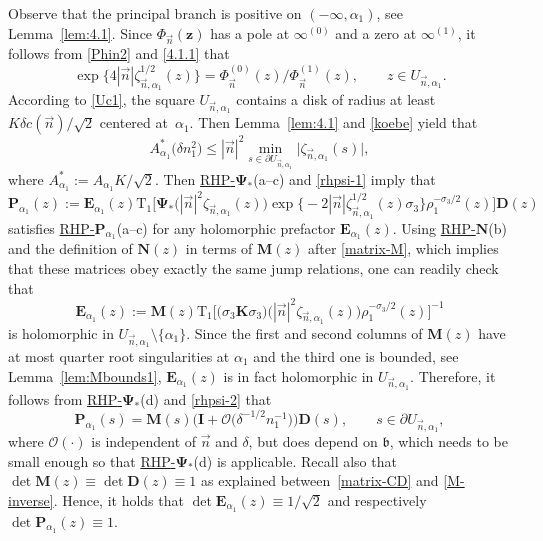 \documentclass[10pt,a4paper]{amsart}
\numberwithin{equation}{section}
\renewcommand{\det}{\operatorname{det}}
\newcommand{\n}{{\vec n}}
\newcommand{\rhn} {\textnormal{RHP}-${\boldsymbol N}$}
\newcommand{\rhp} {\textnormal{RHP}-${\boldsymbol P}$}
\newcommand{\rhwpsi} {\textnormal{RHP}-${\boldsymbol \Psi_*}$}
\newcommand{\z}	{{\boldsymbol z}}
\begin{document}
Observe that the principal branch \smash{$ \zeta_{\n,\alpha_1}^{1/2}(z) $} is positive on $ (-\infty,\alpha_1) $, see Lemma~\ref{lem:4.1}. Since $ \Phi_\n(\z) $ has a pole at $ \infty^{(0)} $ and a zero at $ \infty^{(1)} $, it follows from \eqref{Phin2} and \eqref{4.1.1} that
\begin{equation}
\label{rhpsi-1}
\exp\bigl\{4|\n|\zeta_{\n,\alpha_1}^{1/2}(z) \bigr\} = \Phi_\n^{(0)}(z)/\Phi_\n^{(1)}(z), \qquad z\in U_{\n,\alpha_1}.
\end{equation}
According to \eqref{Uc1}, the square $ U_{\n,\alpha_1} $ contains a disk of radius at least $ K\delta c(\n)/\sqrt 2 $ centered at~$ \alpha_1 $. Then Lemma~\ref{lem:4.1} and \eqref{koebe} yield that
\begin{equation}
\label{rhpsi-2}
 A_{\alpha_1}^* \bigl(\delta n_1^2\bigr) \leq |\n|^2 \min_{s\in\partial U_{\n,\alpha_1}}\big|\zeta_{\n,\alpha_1}(s)\big|,
\end{equation}
where $A_{\alpha_1}^*:=A_{\alpha_1}K/\sqrt 2$. Then \hyperref[rhwpsi]{\rhwpsi}(a--c) and \eqref{rhpsi-1} imply that
\begin{equation}
\label{rhpsi-3}
\boldsymbol P_{\alpha_1}(z) := \boldsymbol E_{\alpha_1}(z) \mathrm{T}_1 \big[ \boldsymbol\Psi_* \bigl(|\n|^2\zeta_{\n,\alpha_1}(z)\bigr) \exp\bigl\{-2|\n|\zeta_{\n,\alpha_1}^{1/2}(z) \sigma_3\bigr\} \rho_1^{-\sigma_3/2}(z) \big] \boldsymbol D(z)
\end{equation}
satisfies \hyperref[rhp]{\rhp$_{\alpha_1}$}(a--c) for any holomorphic prefactor $\boldsymbol E_{\alpha_1}(z)$. Using \hyperref[rhn]{\rhn}(b) and the definition of $ \boldsymbol N(z) $ in terms of $ \boldsymbol M(z) $ after \eqref{matrix-M}, which implies that these matrices obey exactly the same jump relations, one can readily check that
\begin{equation}
\label{rhpsi-4}
\boldsymbol E_{\alpha_1}(z) := \boldsymbol M(z)\mathrm{T}_1\big[ \bigl(\sigma_3\boldsymbol K\sigma_3\bigr) \bigl(|\n|^2\zeta_{\n,\alpha_1}(z)\bigr) \rho_1^{-\sigma_3/2}(z)\big]^{-1}
\end{equation}
is holomorphic in $U_{\n,\alpha_1}\setminus\{\alpha_1\}$. Since the first and second columns of $\boldsymbol M(z)$ have at most quarter root singularities at $ \alpha_1 $ and the third one is bounded, see Lemma~\ref{lem:Mbounds1}, $\boldsymbol E_{\alpha_1}(z)$ is in fact holomorphic in $U_{\n,\alpha_1}$. Therefore, it follows from \hyperref[rhwpsi]{\rhwpsi}(d) and \eqref{rhpsi-2} that
\[%
\boldsymbol P_{\alpha_1}(s)= \boldsymbol M(s) \bigl( \boldsymbol I + \boldsymbol{\mathcal O}\bigl(\delta^{-1/2} n_1^{-1} \bigr) \bigr) \boldsymbol D(s), \qquad s\in \partial U_{\n,\alpha_1},
\]
where $\boldsymbol{\mathcal O}(\cdot) $ is independent of $ \n $ and $ \delta $, but does depend on $ \mathfrak b $, which needs to be small enough so that \hyperref[rhwpsi]{\rhwpsi}(d) is applicable. Recall also that $ \det \boldsymbol M(z) \equiv \det \boldsymbol D(z) \equiv 1 $ as explained between~\eqref{matrix-CD} and \eqref{M-inverse}. Hence, it holds that $ \det \boldsymbol E_{\alpha_1}(z) \equiv 1/\sqrt2 $ and respectively $ {\det \boldsymbol P_{\alpha_1}(z)\equiv 1 }$.
\end{document}
